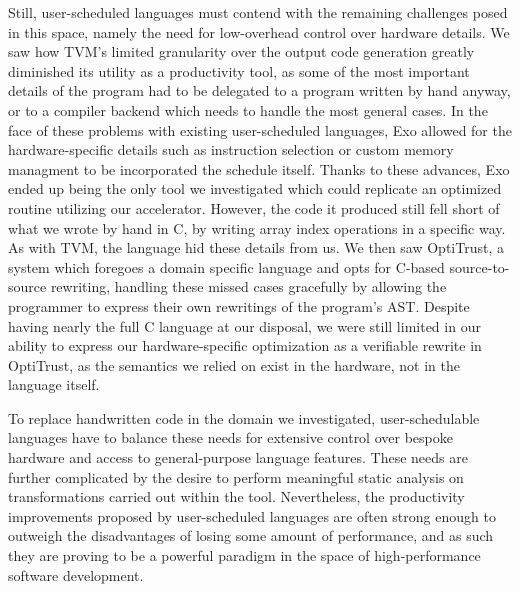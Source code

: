 \documentclass[acmsmall, nonacm=true]{acmart}
\begin{document}
Still, user-scheduled languages must contend with the remaining challenges posed in this space, namely the need for low-overhead control over hardware details. We saw how TVM's limited granularity over the output code generation greatly diminished its utility as a productivity tool, as some of the most important details of the program had to be delegated to a program written by hand anyway, or to a compiler backend which needs to handle the most general cases. In the face of these problems with existing user-scheduled languages, Exo allowed for the hardware-specific details such as instruction selection or custom memory managment to be incorporated the schedule itself.  Thanks to these advances, Exo ended up being the only tool we investigated which could replicate an optimized routine utilizing our accelerator. However, the code it produced still fell short of what we wrote by hand in C, by writing array index operations in a specific way. As with TVM, the language hid these details from us. We then saw OptiTrust, a system which foregoes a domain specific language and opts for C-based source-to-source rewriting, handling these missed cases gracefully by allowing the programmer to express their own rewritings of the program's AST. Despite having nearly the full C language at our disposal, we were still limited in our ability to express our hardware-specific optimization as a verifiable rewrite in OptiTrust, as the semantics we relied on exist in the hardware, not in the language itself.

To replace handwritten code in the domain we investigated, user-schedulable languages have to balance these needs for extensive control over bespoke hardware and access to general-purpose language features. These needs are further complicated by the desire to perform meaningful static analysis on transformations carried out within the tool. Nevertheless, the productivity improvements proposed by user-scheduled languages are often strong enough to outweigh the disadvantages of losing some amount of performance, and as such they are proving to be a powerful paradigm in the space of high-performance software development. 




\clearpage




\clearpage
\end{document}
